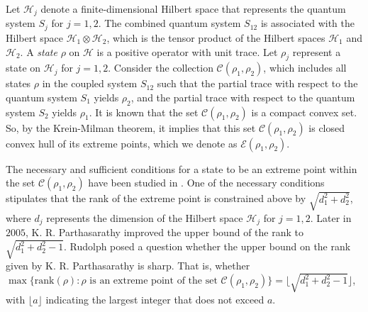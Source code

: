\documentclass[10pt,reqno]{amsart}
\theoremstyle{definition}
\theoremstyle{plain}
\theoremstyle{remark}
\newcommand{\mcl}[1]{\mathcal{#1}}
\newcommand{\msc}[1]{\mathscr{#1}}
\numberwithin{equation}{section}%
\begin{document}

Let $\mcl{H}_j$ denote a finite-dimensional Hilbert space that represents the quantum system $S_j$ for $j=1,2$. The combined quantum system $S_{12}$ is associated with the Hilbert space $\mcl{H}_1\otimes \mcl{H}_2$, which is the tensor product of the Hilbert spaces $\mcl{H}_1$ and $\mcl{H}_2$. A \emph{state} $\rho$ on $\mcl{H}$ is  a positive operator with unit trace. Let $\rho_j$ represent a state on $\mcl{H}_j$ for $j=1,2$. Consider the collection $\msc{C}(\rho_1,\rho_2)$, which includes all states $\rho$ in the coupled system $S_{12}$ such that the partial trace with respect to the quantum system $S_1$ yields $\rho_2$, and the partial trace with respect to the quantum system $S_2$ yields $\rho_1$. It is known that the set $\msc{C}(\rho_1,\rho_2)$ is a compact convex set. So, by the Krein-Milman theorem, it implies that this set $\msc{C}(\rho_1,\rho_2)$ is closed convex hull of its extreme points, which we denote as $\msc{E}(\rho_1,\rho_2)$. 




The necessary and sufficient conditions for a state to be an extreme point within the set  $\msc{C}(\rho_1,\rho_2)$ have been studied in \cite{LaSt93,krp98, Ru04}. One of the necessary conditions stipulates that the rank of the extreme point is constrained above by $\sqrt{d_1^2+d_2^2}$, where $d_j$ represents the dimension of the Hilbert space $\mcl{H}_j$ for $j=1,2$. Later in $2005$, K. R. Parthasarathy \cite{krp05} improved the upper bound of the rank to $\sqrt{d_1^2+d_2^2-1}$. Rudolph posed a question whether the upper bound on the rank given by K. R. Parthasarathy is sharp. That is, whether $\max\{\text{rank}(\rho): \rho \text{ is an extreme point of the set } \msc{C}(\rho_1,\rho_2)\}=\lfloor{\sqrt{d_1^2+d_2^2-1}}\rfloor$, with $\lfloor{a}\rfloor$ indicating the largest integer that does not exceed $a$.
\end{document}
